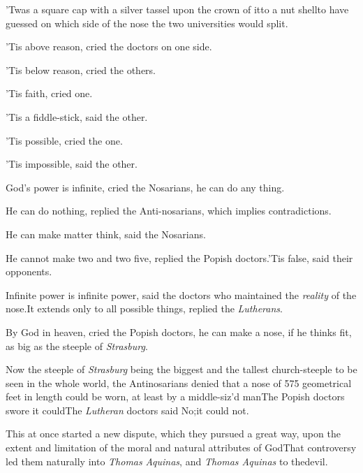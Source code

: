 \documentclass{article}
\begin{document}
\vskip -2pt

’Twas a square cap with a silver tassel upon the crown of
it\tsk to a nut shell\tsk to have guessed on which side of the
nose the two universities would split.

\vskip -2pt

’Tis above reason, cried the doctors on one side.

\vskip -2pt

’Tis below reason, cried the others.

\vskip -2pt

’Tis faith, cried one.

’Tis a fiddle-stick, said the other.

’Tis possible, cried the one.

’Tis impossible, said the other.

God’s power is infinite, cried the Nosarians, he can do
any thing.

He can do nothing, replied the Anti-nosarians, which implies
contradictions.

He can make matter think, said the Nosarians.

\noindent
{}

He cannot make two and two five, replied the Popish
doctors.\tsh ’Tis false, said their opponents.\tsk

Infinite power is infinite power, said the doctors who
maintained the \textit{reality}
of the nose.\tsh It extends only to
all possible things, replied the \textit{Lutherans}.

By God in heaven, cried the Popish doctors, he can make a nose,
if he thinks fit, as big as the steeple of \textit{Strasburg}.

Now the steeple of \textit{Strasburg} being the biggest and the
tallest church-steeple to be seen in the whole world, the
Antino\-sarians denied that a nose of 575 geometrical feet in length
could be worn, at least by a middle-siz’d
man\tsk The Popish doctors swore it could\tsk The
\textit{Lutheran} doctors said No;\tsk it could not.

This at once started a new dispute, which they pursued a great
way, upon the extent and limitation of the moral and natural
attributes of God\tsk That controversy led them naturally into
\textit{Thomas} \textit{Aquinas}, and \textit{Thomas
Aquinas} to the\break devil.
\end{document}
